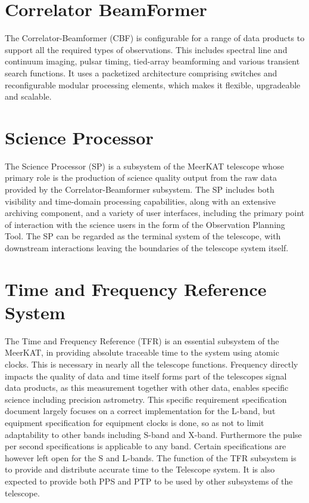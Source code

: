\section{ Correlator BeamFormer}
The Correlator-Beamformer (CBF)\cite{CBF} is configurable for a range of data products to support all
the required types of observations. This includes spectral line and continuum imaging, pulsar
timing, tied-array beamforming and various transient search functions. It uses a packetized
architecture comprising switches and reconfigurable modular processing elements, which
makes it flexible, upgradeable and scalable.
\section{ Science Processor}
The Science Processor (SP)\cite{SP} is a subsystem of the MeerKAT telescope whose primary role is the
production of science quality output from the raw data provided by the Correlator-Beamformer subsystem. 
The SP includes both visibility and time-domain processing capabilities, along with an
extensive archiving component, and a variety of user interfaces, including the primary point
of interaction with the science users in the form of the Observation Planning Tool.
The SP can be regarded as the terminal system of the telescope, with downstream
interactions leaving the boundaries of the telescope system itself.
\section{Time and Frequency Reference System}
The Time and Frequency Reference (TFR)\cite{TFR} is an essential subsystem of the MeerKAT, in providing absolute traceable time to the system using atomic clocks. This is necessary in nearly all the telescope functions.
Frequency directly impacts the quality of data and time itself forms part of the telescopes signal data products, as this measurement together with other data, enables specific science including precision astrometry. 
This specific requirement specification document largely focuses on a correct implementation for the L-band, but equipment specification for equipment clocks is done, 
so as not to limit adaptability to other bands including S-band and X-band. Furthermore the pulse per second specifications is applicable to any band. Certain specifications are however left open for the S and L-bands.
The function of the TFR subsystem is to provide and distribute accurate time to the Telescope system. It is also expected to provide both PPS and PTP to be used by other subsystems of the telescope.
